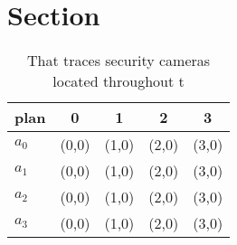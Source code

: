 \documentclass[a4paper]{article}
\begin{document}
\section{Section}

\begin{table}
\begin{adjustbox}{width=0.5\columnwidth}
\begin{tabular}{|l|l|l|l|l|}
\hline
\textbf{plan} & \multicolumn{1}{c|}{\textbf{0}} & \multicolumn{1}{c|}{\textbf{1}} & \multicolumn{1}{c|}{\textbf{2}} & \multicolumn{1}{c|}{\textbf{3}} \\ \hline
\textbf{$a_0$}  & (0,0) & (1,0) & (2,0) & (3,0) \\ \hline
\textbf{$a_1$}  & (0,0) & (1,0) & (2,0) & (3,0) \\ \hline
\textbf{$a_2$}  & (0,0) & (1,0) & (2,0) & (3,0) \\ \hline
\textbf{$a_3$}  & (0,0) & (1,0) & (2,0) & (3,0) \\ \hline
\end{tabular}
\end{adjustbox}
\caption{That traces security cameras located throughout t
}
\end{table}
\end{document}

